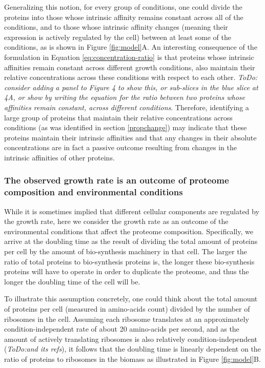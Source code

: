 \documentclass[notitlepage]{article}
\begin{document}
Generalizing this notion, for every group of conditions, one could divide the proteins into those whose intrinsic affinity remains constant across all of the conditions, and to those whose intrinsic affinity changes (meaning their expression is actively regulated by the cell) between at least some of the conditions, as is shown in Figure \ref{fig:model}A.
An interesting consequence of the formulation in Equation \ref{eq:concentration-ratio} is that proteins whose intrinsic affinities remain constant across different growth conditions, also maintain their relative concentrations across these conditions with respect to each other.
\emph{ToDo: consider adding a panel to Figure 4 to show this, or sub-slices in the blue slice at 4A, or show by writing the equation for the ratio between two proteins whose affinities remain constant, across different conditions}.
Therefore, identifying a large group of proteins that maintain their relative concentrations across conditions (as was identified in section \ref{propchange}) may indicate that these proteins maintain their intrinsic affinities and that any changes in their absolute concentrations are in fact a passive outcome resulting from changes in the intrinsic affinities of other proteins.

\subsubsection{The observed growth rate is an outcome of proteome composition and environmental conditions}
While it is sometimes implied that different cellular components are regulated by the growth rate, here we consider the growth rate as an outcome of the environmental conditions that affect the proteome composition.
Specifically, we arrive at the doubling time as the result of dividing the total amount of proteins per cell by the amount of bio-synthesis machinery in that cell.
The larger the ratio of total proteins to bio-synthesis proteins is, the longer these bio-synthesis proteins will have to operate in order to duplicate the proteome, and thus the longer the doubling time of the cell will be.

To illustrate this assumption concretely, one could think about the total amount of proteins per cell (measured in amino-acids count) divided by the number of ribosomes in the cell.
Assuming each ribosome translates at an approximately condition-independent rate of about 20 amino-acids per second, and as the amount of actively translating ribosomes is also relatively condition-independent \cite{Philips2009} (\emph{ToDo:and its refs}), it follows that the doubling time is linearly dependent on the ratio of proteins to ribosomes in the biomass as illustrated in Figure \ref{fig:model}B.
\end{document}
